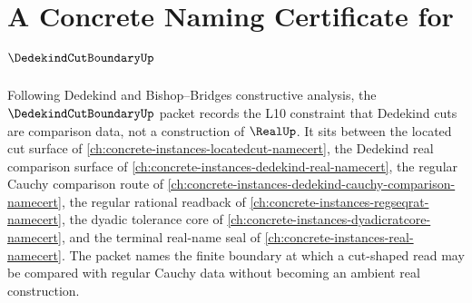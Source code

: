 \chapter{A Concrete Naming Certificate for $\DedekindCutBoundaryUp$}
\label{ch:concrete-instances-dedekind-cut-boundary-namecert}

Following Dedekind and Bishop--Bridges constructive analysis, the $\DedekindCutBoundaryUp$ packet records the L10 constraint that Dedekind cuts are comparison data, not a construction of $\RealUp$. It sits between the located cut surface of \autoref{ch:concrete-instances-locatedcut-namecert}, the Dedekind real comparison surface of \autoref{ch:concrete-instances-dedekind-real-namecert}, the regular Cauchy comparison route of \autoref{ch:concrete-instances-dedekind-cauchy-comparison-namecert}, the regular rational readback of \autoref{ch:concrete-instances-regseqrat-namecert}, the dyadic tolerance core of \autoref{ch:concrete-instances-dyadicratcore-namecert}, and the terminal real-name seal of \autoref{ch:concrete-instances-real-namecert}. The packet names the finite boundary at which a cut-shaped read may be compared with regular Cauchy data without becoming an ambient real construction.

